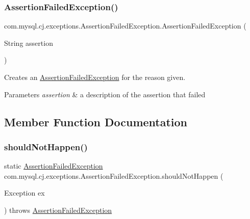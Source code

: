 \subsubsection{\texorpdfstring{Assertion\+Failed\+Exception()}{AssertionFailedException()}\hspace{0.1cm}{\footnotesize\ttfamily [2/2]}}
{\footnotesize\ttfamily com.\+mysql.\+cj.\+exceptions.\+Assertion\+Failed\+Exception.\+Assertion\+Failed\+Exception (\begin{DoxyParamCaption}\item[{String}]{assertion }\end{DoxyParamCaption})}

Creates an \mbox{\hyperlink{classcom_1_1mysql_1_1cj_1_1exceptions_1_1_assertion_failed_exception}{Assertion\+Failed\+Exception}} for the reason given.


\begin{DoxyParams}{Parameters}
{\em assertion} & a description of the assertion that failed \\
\hline
\end{DoxyParams}


\subsection{Member Function Documentation}
\mbox{\label{classcom_1_1mysql_1_1cj_1_1exceptions_1_1_assertion_failed_exception_a357eac18cfa5a41a6fd49b3ee7af086c}} 
\subsubsection{\texorpdfstring{should\+Not\+Happen()}{shouldNotHappen()}\hspace{0.1cm}{\footnotesize\ttfamily [1/2]}}
{\footnotesize\ttfamily static \mbox{\hyperlink{classcom_1_1mysql_1_1cj_1_1exceptions_1_1_assertion_failed_exception}{Assertion\+Failed\+Exception}} com.\+mysql.\+cj.\+exceptions.\+Assertion\+Failed\+Exception.\+should\+Not\+Happen (\begin{DoxyParamCaption}\item[{Exception}]{ex }\end{DoxyParamCaption}) throws \mbox{\hyperlink{classcom_1_1mysql_1_1cj_1_1exceptions_1_1_assertion_failed_exception}{Assertion\+Failed\+Exception}}\hspace{0.3cm}{\ttfamily [static]}}

